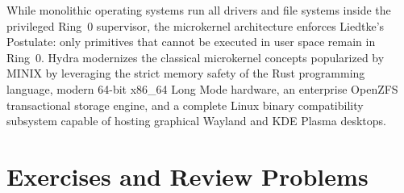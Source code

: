 While monolithic operating systems run all drivers and file systems inside the privileged Ring~0 supervisor, the microkernel architecture enforces Liedtke's Postulate: only primitives that cannot be executed in user space remain in Ring~0. Hydra modernizes the classical microkernel concepts popularized by MINIX by leveraging the strict memory safety of the Rust programming language, modern 64-bit x86\_64 Long Mode hardware, an enterprise OpenZFS transactional storage engine, and a complete Linux binary compatibility subsystem capable of hosting graphical Wayland and KDE Plasma desktops.

\section{Exercises and Review Problems}
\label{sec:exercises_chap1}

